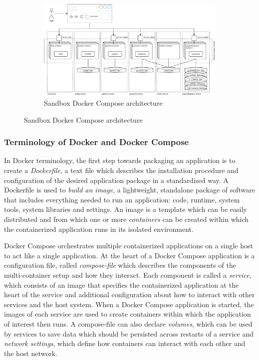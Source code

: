 \documentclass[11pt, a4paper, oneside, parskip=full-]{scrartcl}
\begin{document}
 \begin{figure}
  \centering
  \begin{figure}[H]
    \centering
    \includegraphics[width=1\textwidth]{composeSetup}
    \caption{Sandbox Docker Compose architecture}
    \label{fig:sandboxsetup}
  \end{figure}
\end{figure}

\subsubsection*{Terminology of Docker and Docker Compose}
In Docker terminology, the first step towards packaging an application is to
create a \emph{Dockerfile}, a text file which describes the installation
procedure and configuration of the desired application package in a standardized
way. A Dockerfile is used to \emph{build an image}, a lightweight, standalone
package of software that includes everything needed to run an application: code,
runtime, system tools, system libraries and settings\cite{dockerimage}. An image
is a template which can be easily distributed and from which one or more
\emph{containers} can be created within which the containerized application runs
in its isolated environment.

Docker Compose orchestrates multiple containerized applications on a single host
to act like a single application. At the heart of a Docker Compose application
is a configuration file, called \emph{compose-file} which describes the
components of the multi-container setup and how they interact. Each component is
called a \emph{service}, which consists of an image that specifies the
containerized application at the heart of the service and additional
configuration about how to interact with other services and the host system.
When a Docker Compose application is started, the images of each service are
used to create containers within which the application of interest then runs. A
compose-file can also declare \emph{volumes}, which can be used by services to
save data which should be persisted across restarts of a service and
\emph{network settings}, which define how containers can interact with each
other and the host network.
\end{document}
